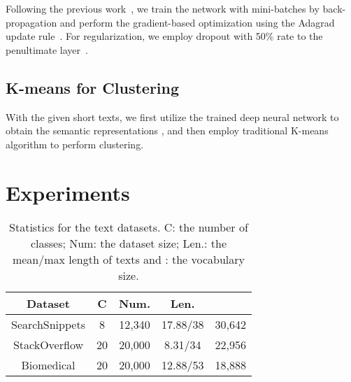 \documentclass[review]{elsarticle}
\begin{document}
Following the previous work~\cite{16_blunsom2014convolutional}, we train the network with mini-batches by back-propagation and perform the gradient-based optimization using the Adagrad update rule~\cite{36_duchi2011adaptive}. For regularization, we employ dropout with 50\% rate to the penultimate layer~\cite{16_blunsom2014convolutional,22_kim2014convolutional}.

\subsection{K-means for Clustering}
With the given short texts, we first utilize the trained deep neural network to obtain the semantic representations , and then employ traditional K-means algorithm to perform clustering.

\section{Experiments}
\label{sec:Experiments}

\begin{table}[t] \begin{center}
\begin{tabular}{|c|c|c|c|c|}\hline
Dataset&C &Num. &Len. &\\\hline \hline
SearchSnippets   &	8    &	12,340     &	17.88/38  &	30,642       \\
StackOverflow     &	20    &	20,000     &	8.31/34  &	22,956       \\
Biomedical     &	20    &	20,000     &	 12.88/53 &	18,888       \\\hline
\end{tabular}
\end{center}
\caption{\label{tb:Datasets} Statistics for the text datasets. C: the number of classes; Num: the dataset size; Len.: the mean/max length of texts and : the vocabulary size.}
\end{table}
\end{document}
